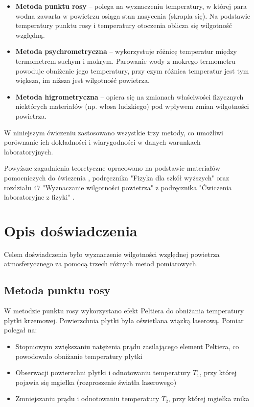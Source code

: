 \documentclass[a4paper,12pt]{article}
\begin{document}
\begin{itemize}
    \item \textbf{Metoda punktu rosy} – polega na wyznaczeniu temperatury, w której para wodna zawarta w powietrzu osiąga stan nasycenia (skrapla się). Na podstawie temperatury punktu rosy i temperatury otoczenia oblicza się wilgotność względną.

    \item \textbf{Metoda psychrometryczna} – wykorzystuje różnicę temperatur między termometrem suchym i mokrym. Parowanie wody z mokrego termometru powoduje obniżenie jego temperatury, przy czym różnica temperatur jest tym większa, im niższa jest wilgotność powietrza.

    \item \textbf{Metoda higrometryczna} – opiera się na zmianach właściwości fizycznych niektórych materiałów (np. włosa ludzkiego) pod wpływem zmian wilgotności powietrza.
\end{itemize}

W niniejszym ćwiczeniu zastosowano wszystkie trzy metody, co umożliwi porównanie ich dokładności i wiarygodności w danych warunkach laboratoryjnych.

\vspace{0.5cm}
\noindent
Powyższe zagadnienia teoretyczne opracowano na podstawie materiałów pomocniczych do ćwiczenia \cite{materialy_pomoc_22}, podręcznika "Fizyka dla szkół wyższych" \cite{fizyka_dla_szkół_wyższych_tom_2} oraz rozdziału 47 "Wyznaczanie wilgotności powietrza" z podręcznika "Ćwiczenia laboratoryjne z fizyki" \cite{Drynski1976}.

\section{Opis doświadczenia}

Celem doświadczenia było wyznaczenie wilgotności względnej powietrza atmosferycznego za pomocą trzech różnych metod pomiarowych.

\subsection{Metoda punktu rosy}

W metodzie punktu rosy wykorzystano efekt Peltiera do obniżania temperatury płytki krzemowej. Powierzchnia płytki była oświetlana wiązką laserową. Pomiar polegał na:
\begin{itemize}
    \item Stopniowym zwiększaniu natężenia prądu zasilającego element Peltiera, co powodowało obniżanie temperatury płytki
    \item Obserwacji powierzchni płytki i odnotowaniu temperatury $T_1$, przy której pojawia się mgiełka (rozproszenie światła laserowego)
    \item Zmniejszaniu prądu i odnotowaniu temperatury $T_2$, przy której mgiełka znika
\end{itemize}
\end{document}

